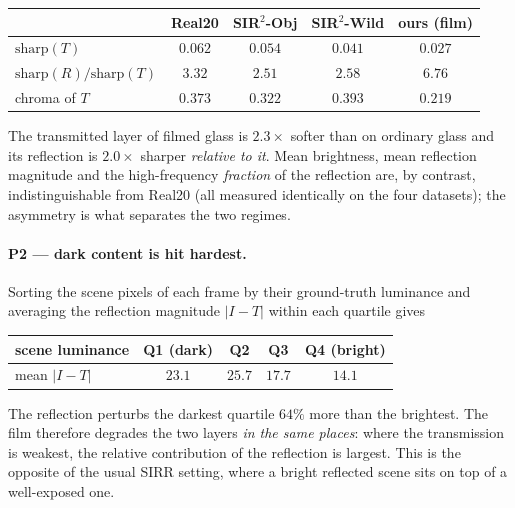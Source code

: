 \begin{center}
\small
\setlength{\tabcolsep}{4pt}
\begin{tabular}{@{}lcccc@{}}
\toprule
 & Real20 & SIR$^2$-Obj & SIR$^2$-Wild & \textbf{ours (film)} \\
\midrule
$\mathrm{sharp}(T)$ & $0.062$ & $0.054$ & $0.041$ & $\mathbf{0.027}$ \\
$\mathrm{sharp}(R)/\mathrm{sharp}(T)$ & $3.32$ & $2.51$ & $2.58$ & $\mathbf{6.76}$ \\
chroma of $T$ & $0.373$ & $0.322$ & $0.393$ & $\mathbf{0.219}$ \\
\bottomrule
\end{tabular}
\end{center}

The transmitted layer of filmed glass is $2.3\times$ softer than on ordinary glass and its
reflection is $2.0\times$ sharper \emph{relative to it}. Mean brightness, mean reflection
magnitude and the high-frequency \emph{fraction} of the reflection are, by contrast,
indistinguishable from Real20 (all measured identically on the four datasets); the asymmetry is what separates the two
regimes.

\paragraph{P2 --- dark content is hit hardest.}
Sorting the scene pixels of each frame by their ground-truth luminance and averaging the
reflection magnitude $|I-T|$ within each quartile gives

\begin{center}
\small
\setlength{\tabcolsep}{4pt}
\begin{tabular}{@{}lcccc@{}}
\toprule
scene luminance & Q1 (dark) & Q2 & Q3 & Q4 (bright) \\
\midrule
mean $|I-T|$ & $\mathbf{23.1}$ & $25.7$ & $17.7$ & $14.1$ \\
\bottomrule
\end{tabular}
\end{center}

The reflection perturbs the darkest quartile $64\%$ more than the brightest. The film
therefore degrades the two layers \emph{in the same places}: where the transmission is
weakest, the relative contribution of the reflection is largest. This is the opposite of
the usual SIRR setting, where a bright reflected scene sits on top of a well-exposed one.

